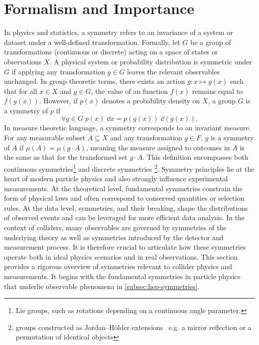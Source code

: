 \section{Formalism and Importance}
\label{sec:formalism-and-role}
    In physics and statistics, a symmetry refers to an invariance of a system or dataset under a well-defined transformation.
    Formally, let $G$ be a group of transformations (continuous or discrete) acting on a space of states or observations $X$.
    A physical system or probability distribution is symmetric under $G$ if applying any transformation $g \in G$ leaves the relevant observables unchanged.
    In group theoretic terms, there exists an action $g: x \mapsto g(x)$ such that for all $x \in X$ and $g \in G$, the value of an function $f(x)$ remains equal to $f(g(x))$.
    However, if $p(x)$ denotes a probability density on $X$, a group $G$ is a symmetry of \(p\) if
    \[
        \forall g \in G \; p(x) \; \dd x = p(g(x)) \; \dd(g(x)).
    \]
    In measure theoretic language, a symmetry corresponds to an invariant measure.
    For any measurable subset $A \subseteq X$ and any transformation $g\in F$, \(g\) is a symmetry of \(A\) if $\mu(A) = \mu(g\cdot A)$, meaning the measure assigned to outcomes in $A$ is the same as that for the transformed set $g\cdot A$.
    This definition encompasses both continuous symmetries\footnote{Lie groups, such as rotations depending on a continuous angle parameter.} and discrete symmetries \footnote{groups constructed as Jordan--H\"older extensions~\cite{solomon_brief_2001, HolderDieOrdnungszahlen, jordan_traite_nodate} e.g. a mirror reflection or a permutation of identical objects}.
    Symmetry principles lie at the heart of modern particle physics and also strongly influence experimental measurements.
    At the theoretical level, fundamental symmetries constrain the form of physical laws and often correspond to conserved quantities or selection rules.
    At the data level, symmetries, and their breaking, shape the distributions of observed events and can be leveraged for more efficient data analysis.
    In the context of colliders, many observables are governed by symmetries of the underlying theory as well as symmetries introduced by the detector and measurement process.
    It is therefore crucial to articulate how these symmetries operate both in ideal physics scenarios and in real observations.
    This section provides a rigorous overview of symmetries relevant to collider physics and measurements.
    It begins with the fundamental symmetries in particle physics that underlie observable phenomena in \cref{subsec:hep-symmetries}.
